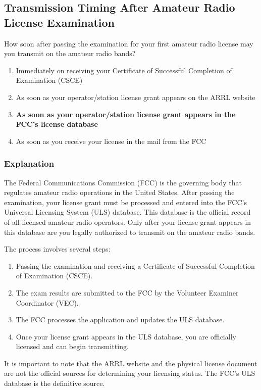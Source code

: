 \subsection{Transmission Timing After Amateur Radio License Examination}
\label{T1C10}

\begin{tcolorbox}[colback=gray!10!white,colframe=black!75!black,title=T1C10]
How soon after passing the examination for your first amateur radio license may you transmit on the amateur radio bands?
\begin{enumerate}[label=\Alph*)]
    \item Immediately on receiving your Certificate of Successful Completion of Examination (CSCE)
    \item As soon as your operator/station license grant appears on the ARRL website
    \item \textbf{As soon as your operator/station license grant appears in the FCC’s license database}
    \item As soon as you receive your license in the mail from the FCC
\end{enumerate}
\end{tcolorbox}

\subsubsection{Explanation}
The Federal Communications Commission (FCC) is the governing body that regulates amateur radio operations in the United States. After passing the examination, your license grant must be processed and entered into the FCC’s Universal Licensing System (ULS) database. This database is the official record of all licensed amateur radio operators. Only after your license grant appears in this database are you legally authorized to transmit on the amateur radio bands. 

The process involves several steps:
\begin{enumerate}
    \item Passing the examination and receiving a Certificate of Successful Completion of Examination (CSCE).
    \item The exam results are submitted to the FCC by the Volunteer Examiner Coordinator (VEC).
    \item The FCC processes the application and updates the ULS database.
    \item Once your license grant appears in the ULS database, you are officially licensed and can begin transmitting.
\end{enumerate}

It is important to note that the ARRL website and the physical license document are not the official sources for determining your licensing status. The FCC’s ULS database is the definitive source.

